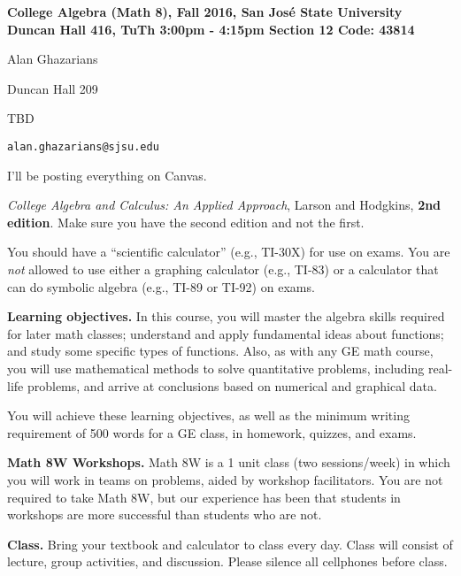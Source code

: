 \documentclass[letterpaper]{article}
\begin{document}
\begin{center}\bf
College Algebra (Math 8), Fall 2016, San Jos\'{e} State University \\
Duncan Hall 416, TuTh 3:00pm - 4:15pm Section 12 Code: 43814
\end{center}

\begin{description}
\setlength{\itemsep}{0in}
\item[Instructor:] Alan Ghazarians
\item[Office and phone:] Duncan Hall 209
\item[Office hours:] TBD
\item[E-mail:] {\tt alan.ghazarians@sjsu.edu}
\item[Course web page:] I'll be posting everything on Canvas. 
\item[Texts:] {\it College Algebra and Calculus: An Applied Approach},
	Larson and Hodgkins, {\bf 2nd edition}.  Make sure you have the second
	edition and not the first.
\item[Calculator:] You should have a ``scientific calculator'' (e.g.,
  TI-30X) for use on exams.  You are {\it not\/} allowed to use either
  a graphing calculator (e.g., TI-83) or a calculator that can do symbolic
  algebra (e.g., TI-89 or TI-92) on exams.
\end{description}

{\bf Learning objectives.}  In this course, you will master the
algebra skills required for later math classes; understand and apply
fundamental ideas about functions; and study some
specific types of functions.
Also, as with any GE math course,
you will use mathematical methods to solve quantitative problems,
including real-life problems, and arrive at conclusions based on
numerical and graphical data.

You will achieve these learning objectives, as well as the minimum
writing requirement of 500 words for a GE class, in homework, quizzes, and exams.

{\bf Math 8W Workshops.\/} Math 8W is a 1 unit class (two sessions/week)
in which you will work in teams on problems, aided by
workshop facilitators.  You are not required to take Math 8W, but
our experience has been that students in workshops are more
successful than students who are not.

{\bf Class.}  Bring your textbook and calculator to class every day.
Class will consist of lecture, group activities, and discussion.
Please silence all cellphones before class.
\end{document}

